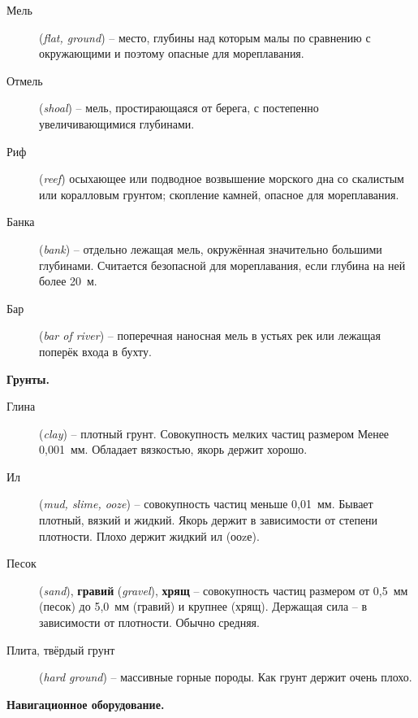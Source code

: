 \begin{description}
\item [Мель] (\textit{flat, ground}) \--- место, глубины
  над которым малы по сравнению с окружающими и поэтому опасные для
  мореплавания.
\item [Отмель] (\textit{shoal}) \--- мель,
  простирающаяся от берега, с постепенно увеличивающимися глубинами.
\item [Риф] (\textit{reef}) осыхающее или подводное возвышение
  морского дна со скалистым или коралловым грунтом; скопление камней,
  опасное для мореплавания.
\item [Банка] (\textit{bank}) \--- отдельно
  лежащая мель, окружённая значительно большими глубинами. Считается
  безопасной для мореплавания, если глубина на ней более 20~м.
\item [Бар] (\textit{bar of river})
  \--- поперечная наносная мель в устьях рек или лежащая поперёк входа в бухту. 
\end{description}

\textbf{Грунты.}

\begin{description}
\item [Глина] (\textit{clay}) \--- плотный
  грунт. Совокупность мелких частиц размером Менее 0,001~мм. Обладает
  вязкостью, якорь держит хорошо.
\item [Ил] (\textit{mud, slime, ooze}) \---
  совокупность частиц меньше 0,01~мм. Бывает плотный, вязкий и
  жидкий. Якорь держит в зависимости от степени плотности. Плохо
  держит жидкий ил (ооzе).
\item [Песок] (\textit{sand}), \textbf{гравий} (\textit{gravel}), \textbf{хрящ}
  \--- совокупность частиц размером от 0,5~мм (песок) до 5,0~мм (гравий) и крупнее (хрящ). Держащая сила \--- в зависимости от плотности. Обычно средняя. 
\item [Плита, твёрдый грунт] (\textit{hard ground})
  \--- массивные горные породы. Как грунт держит очень плохо. 
\end{description}

\textbf{Навигационное оборудование.}

